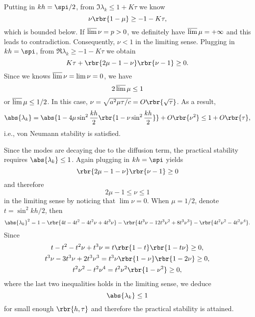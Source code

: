 \documentclass[english, nochinese]{pnote}
\begin{document}
Putting in $ k h = \spi / 2 $, from $ \Im \lambda_k \le 1 + K \tau $ we know
\begin{equation}
\nu \rbr{ 1 - \mu } \ge -1 - K \tau,
\end{equation}
which is bounded below. If $ \varlimsup \nu = p > 0 $, we definitely have $ \varlimsup \mu = +\infty $ and this leads to contradiction. Consequently, $ \nu < 1 $ in the limiting sense. Plugging in $ k h = \spi $, from $ \Re \lambda_k \ge -1 - K \tau $ we obtain
\begin{equation}
K \tau + \rbr{ 2 \mu - 1 - \nu } \rbr{ \nu - 1 } \ge 0.
\end{equation}
Since we knows $ \varlimsup \nu = \lim \nu = 0 $, we have
\begin{equation}
2 \varlimsup \mu \le 1
\end{equation}
or $ \varlimsup \mu \le 1 / 2 $. In this case, $ \nu = \sqrt{ a^2 \mu \tau / c } = O \rbr{\sqrt{\tau}} $. As a result,
\begin{equation}
\abs{\lambda_k} = \abs{ 1 - 4 \mu \sin^2 \frac{ k h }{2} \rbr{ 1 - \nu \sin^2 \frac{ k h }{2} } }+ O \rbr{\nu^2} \le 1 + O \rbr{\tau},
\end{equation}
i.e., von Neumann stability is satisfied.

Since the modes are decaying due to the diffusion term, the practical stability requires $ \abs{\lambda_k} \le 1 $. Again plugging in $ k h = \spi$ yields
\begin{equation}
\rbr{ 2 \mu - 1 - \nu } \rbr{ \nu - 1 } \ge 0
\end{equation}
and therefore
\begin{equation}
2 \mu - 1 \le \nu \le 1
\end{equation}
in the limiting sense by noticing that $ \lim \nu = 0 $. When $ \mu = 1 / 2 $, denote $ t = \sin^2 k h / 2 $, then
\begin{equation}
\abs{\lambda_k}^2 = 1 - \rbr{ 4 t - 4 t^2 - 4 t^2 \nu + 4 t^3 \nu } - \rbr{ 4 t^3 \nu - 12 t^3 \nu^2 + 8 t^3 \nu^3 } - \rbr{ 4 t^2 \nu^2 - 4 t^2 \nu^4 }.
\end{equation}
Since
\begin{gather}
t - t^2 - t^2 \nu + t^3 \nu = t \rbr{ 1 - t } \rbr{ 1 - t \nu } \ge 0, \\
t^3 \nu - 3 t^3 \nu + 2 t^3 \nu^3 = t^3 \nu \rbr{ 1 - \nu } \rbr{ 1 - 2 \nu } \ge 0, \\
t^2 \nu^2 - t^2 \nu^4 = t^2 \nu^2 \rbr{ 1 - \nu^2 } \ge 0,
\end{gather}
where the last two inequalities holds in the limiting sense, we deduce
\begin{equation}
\abs{\lambda_k} \le 1
\end{equation}
for small enough $ \rbr{ h, \tau } $ and therefore the practical stability is attained.
\end{document}
